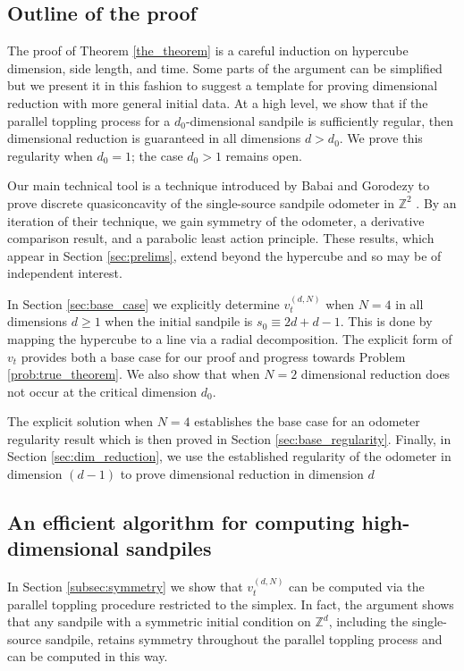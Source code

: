 \documentclass[12pt]{amsart}
\newcommand{\Z}{\mathbb{Z}}
\begin{document}
	
	
	
	
	\subsection{Outline of the proof}
	The proof of Theorem \ref{the_theorem} is a careful induction on hypercube dimension, side length, and time. Some parts of the argument can be simplified 
	but we present it in this fashion to suggest a template for proving dimensional reduction with more general initial data. At a high level, 
	we show that if the parallel toppling process for a $d_0$-dimensional sandpile is sufficiently regular, then dimensional reduction is guaranteed 
	in all dimensions $d > d_0$. We prove this regularity when $d_0=1$; the case $d_0 > 1$ remains open. 
	
	
	Our main technical tool is a technique introduced by Babai and Gorodezy to prove discrete quasiconcavity of the single-source sandpile odometer in $\Z^2$ \cite{babai2007sandpile}. By an iteration of their technique, we gain symmetry of the odometer, a derivative comparison result, and a parabolic least action principle. These results, which appear in Section \ref{sec:prelims}, extend beyond the hypercube and so may be of independent interest. 
	
	
	In Section \ref{sec:base_case} we explicitly determine $v_t^{(d,N)}$ when $N=4$ in all dimensions $d \geq 1$ when the initial sandpile is $s_0 \equiv 2 d + d-1$. This is done by 
	mapping the hypercube to a line via a radial decomposition. The explicit form of $v_t$ provides both a base case for our proof and progress towards Problem \ref{prob:true_theorem}.	We also show that when $N=2$ dimensional reduction does not occur at the critical dimension $d_0$. 
	
	The explicit solution when $N=4$ establishes the base case for an odometer regularity result which is then proved in Section \ref{sec:base_regularity}. Finally, in Section \ref{sec:dim_reduction}, we use the established regularity of the odometer in dimension $(d-1)$ to prove dimensional reduction in dimension $d$ 
	
		\subsection*{An efficient algorithm for computing high-dimensional sandpiles}
	In Section \ref{subsec:symmetry} we show that $v_t^{(d,N)}$ can be computed via the parallel toppling procedure restricted to the simplex. In fact, the argument shows that any sandpile with a symmetric initial condition on $\Z^d$, including the single-source sandpile, retains symmetry throughout the parallel toppling process and can be computed in this way. 
	
\end{document}
